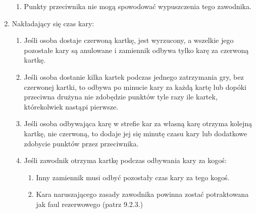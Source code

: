 \documentclass[11pt,a4paper]{article}
\begin{document}
\begin{enumerate}
\begin{enumerate}
    \item Punkty przeciwnika nie mogą spowodować wypuszczenia tego zawodnika.
  \end{enumerate}
  \item Nakładający się czas kary:
  \begin{enumerate}
    \item Jeśli osoba dostaje czerwoną kartkę, jest wyrzucony, a wszelkie jego pozostałe kary są anulowane i zamiennik odbywa tylko karę za czerwoną kartkę.
    \item Jeśli osoba dostanie kilka kartek podczas jednego zatrzymania gry, bez czerwonej kartki, to odbywa po minucie kary za każdą kartę lub dopóki przeciwna drużyna nie zdobędzie punktów tyle razy ile kartek, którekolwiek nastąpi pierwsze.
    \item Jeśli osoba odbywająca karę w strefie kar za własną karę otrzyma kolejną kartkę, nie czerwoną, to dodaje jej się minutę czasu kary lub dodatkowe zdobycie punktów przez przeciwnika.
    \item Jeśli zawodnik otrzyma kartkę podczas odbywania kary za kogoś:
    \begin{enumerate}
      \item Inny zamiennik musi odbyć pozostały czas kary za tego kogoś.
      \item Kara naruszającego zasady zawodnika powinna zostać potraktowana jak faul rezerwowego (patrz 9.2.3.) %
    \end{enumerate}
  \end{enumerate}
\end{enumerate}
\end{document}
